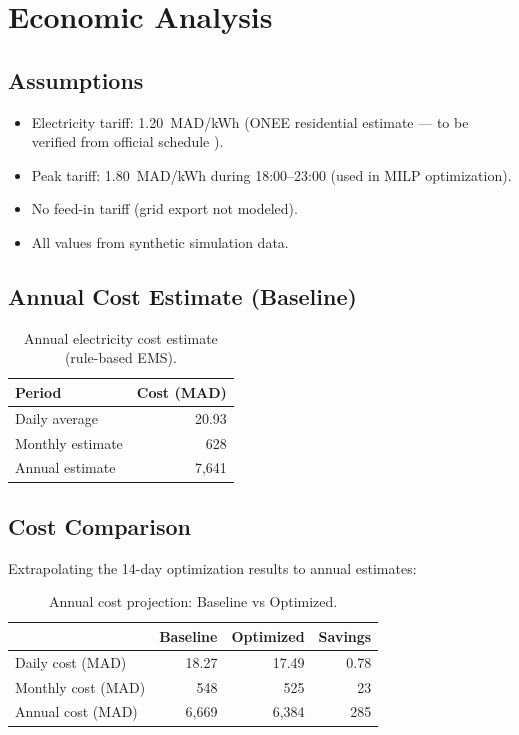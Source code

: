 \chapter{Economic Analysis}
\label{ch:economic}

\section{Assumptions}

\begin{itemize}[nosep]
    \item Electricity tariff: 1.20~MAD/kWh (ONEE residential estimate --- to be verified from official schedule \cite{onee}).
    \item Peak tariff: 1.80~MAD/kWh during 18:00--23:00 (used in MILP optimization).
    \item No feed-in tariff (grid export not modeled).
    \item All values from synthetic simulation data.
\end{itemize}

\section{Annual Cost Estimate (Baseline)}

\begin{table}[H]
\centering
\caption{Annual electricity cost estimate (rule-based EMS).}
\begin{tabular}{lr}
\toprule
\textbf{Period} & \textbf{Cost (MAD)} \\
\midrule
Daily average & 20.93 \\
Monthly estimate & 628 \\
Annual estimate & 7,641 \\
\bottomrule
\end{tabular}
\end{table}

\section{Cost Comparison}

Extrapolating the 14-day optimization results to annual estimates:

\begin{table}[H]
\centering
\caption{Annual cost projection: Baseline vs Optimized.}
\begin{tabular}{lrrr}
\toprule
 & \textbf{Baseline} & \textbf{Optimized} & \textbf{Savings} \\
\midrule
Daily cost (MAD) & 18.27 & 17.49 & 0.78 \\
Monthly cost (MAD) & 548 & 525 & 23 \\
Annual cost (MAD) & 6,669 & 6,384 & 285 \\
\bottomrule
\end{tabular}
\end{table}

